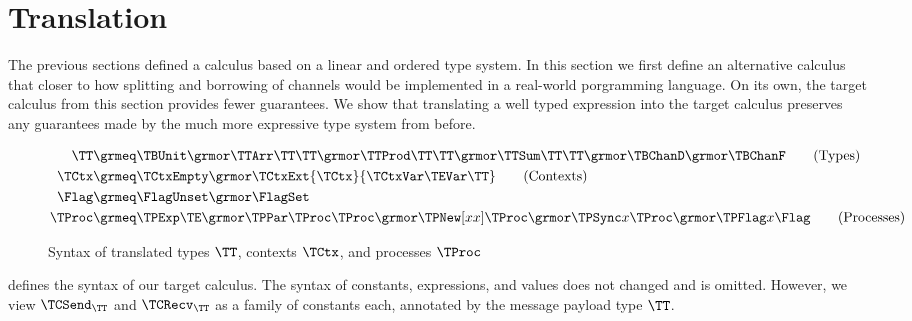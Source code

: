 \clearpage
\section{Translation}
\label{sec:translation}

The previous sections defined a calculus based on a linear and ordered type
system. In this section we first define an alternative calculus that closer to
how splitting and borrowing of channels would be implemented in a real-world
porgramming language. On its own, the target calculus from this section
provides fewer guarantees. We show that translating a well typed expression
into the target calculus preserves any guarantees made by the much more
expressive type system from before.

\begin{figure}
  \setlength{\abovedisplayskip}{0pt}%
  \setlength{\belowdisplayskip}{0pt}%
  \begin{align*}
    \TT \grmeq
        & \TBUnit \grmor \TTArr\TT\TT \grmor \TTProd\TT\TT
                  \grmor \TTSum\TT\TT \grmor \TBChanD \grmor \TBChanF
          \tag{Types}
    \\
    \TCtx \grmeq
        & \TCtxEmpty \grmor \TCtxExt{\TCtx}{\TCtxVar\TEVar\TT}
          \tag{Contexts}
    \\
    \Flag \grmeq
      & \FlagUnset \grmor \FlagSet
    \\
    \TProc \grmeq
        & \TPExp\TE
          \grmor \TPPar\TProc\TProc
          \grmor \TPNew[xx] \TProc
          \grmor \TPSync x \TProc
          \grmor \TPFlag x \Flag
          \tag{Processes}
  \end{align*}
  \caption{Syntax of translated types $\TT$, contexts $\TCtx$, and processes
    $\TProc$}
  \label{fig:unr-syntax}
\end{figure}

 defines the syntax of our target calculus. The syntax of
constants, expressions, and values does not changed and is omitted. However, we
view $\TCSend_{\TT}$ and $\TCRecv_{\TT}$ as a family of constants each,
annotated by the message payload type $\TT$.

